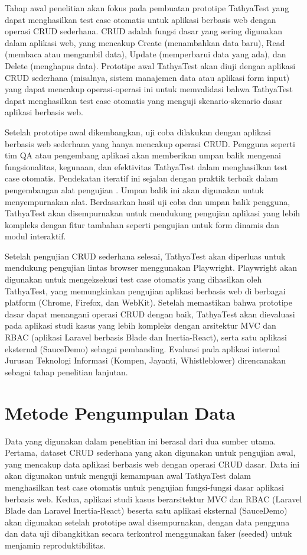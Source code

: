 Tahap awal penelitian akan fokus pada pembuatan prototipe TathyaTest yang dapat menghasilkan test case otomatis untuk aplikasi berbasis web dengan operasi CRUD sederhana. CRUD adalah fungsi dasar yang sering digunakan dalam aplikasi web, yang mencakup Create (menambahkan data baru), Read (membaca atau mengambil data), Update (memperbarui data yang ada), dan Delete (menghapus data). Prototipe awal TathyaTest akan diuji dengan aplikasi CRUD sederhana (misalnya, sistem manajemen data atau aplikasi form input) yang dapat mencakup operasi-operasi ini untuk memvalidasi bahwa TathyaTest dapat menghasilkan test case otomatis yang menguji skenario-skenario dasar aplikasi berbasis web.

Setelah prototipe awal dikembangkan, uji coba dilakukan dengan aplikasi berbasis web sederhana yang hanya mencakup operasi CRUD. Pengguna seperti tim QA atau pengembang aplikasi akan memberikan umpan balik mengenai fungsionalitas, kegunaan, dan efektivitas TathyaTest dalam menghasilkan test case otomatis. Pendekatan iteratif ini sejalan dengan praktik terbaik dalam pengembangan alat pengujian \parencite{shah2021}. Umpan balik ini akan digunakan untuk menyempurnakan alat. Berdasarkan hasil uji coba dan umpan balik pengguna, TathyaTest akan disempurnakan untuk mendukung pengujian aplikasi yang lebih kompleks dengan fitur tambahan seperti pengujian untuk form dinamis dan modul interaktif.

Setelah pengujian CRUD sederhana selesai, TathyaTest akan diperluas untuk mendukung pengujian lintas browser menggunakan Playwright. Playwright akan digunakan untuk mengeksekusi test case otomatis yang dihasilkan oleh TathyaTest, yang memungkinkan pengujian aplikasi berbasis web di berbagai platform (Chrome, Firefox, dan WebKit). Setelah memastikan bahwa prototipe dasar dapat menangani operasi CRUD dengan baik, TathyaTest akan dievaluasi pada aplikasi studi kasus yang lebih kompleks dengan arsitektur MVC dan RBAC (aplikasi Laravel berbasis Blade dan Inertia-React), serta satu aplikasi eksternal (SauceDemo) sebagai pembanding. Evaluasi pada aplikasi internal Jurusan Teknologi Informasi (Kompen, Jayanti, Whistleblower) direncanakan sebagai tahap penelitian lanjutan.

\section{Metode Pengumpulan Data}\label{metode-pengumpulan-data}

Data yang digunakan dalam penelitian ini berasal dari dua sumber utama. Pertama, dataset CRUD sederhana yang akan digunakan untuk pengujian awal, yang mencakup data aplikasi berbasis web dengan operasi CRUD dasar. Data ini akan digunakan untuk menguji kemampuan awal TathyaTest dalam menghasilkan test case otomatis untuk pengujian fungsi-fungsi dasar aplikasi berbasis web. Kedua, aplikasi studi kasus berarsitektur MVC dan RBAC (Laravel Blade dan Laravel Inertia-React) beserta satu aplikasi eksternal (SauceDemo) akan digunakan setelah prototipe awal disempurnakan, dengan data pengguna dan data uji dibangkitkan secara terkontrol menggunakan faker (seeded) untuk menjamin reproduktibilitas.

